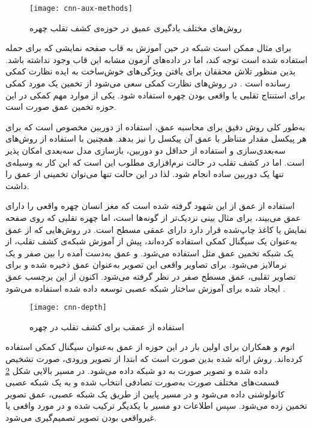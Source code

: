 \begin{figure}[h]
	\centerline{\texttt{[image: cnn-aux-methods]}}
	\caption{روش‌های مختلف یادگیری عمیق در حوزه‌ی کشف تقلب چهره \cite{yu2021deep}}
	\label{fig:cnn-aux-methods}
\end{figure}

برای مثال ممکن است شبکه در حین آموزش به قاب صفحه نمایشی که برای حمله استفاده شده است توجه کند، اما در داده‌های آزمون مشابه این قاب وجود نداشته باشد. بدین منظور تلاش محققان برای یافتن ویژگی‌های خوش‌ساخت
 به ایده نظارت کمکی
  رسانده است
\cite{liu2018learning}.  
در روش‌های نظارت کمکی سعی می‌شود از تخمین یک مورد کمکی برای استنتاج تقلبی یا واقعی بودن چهره استفاده شود. یکی از موارد مهم کمکی در این حوزه تخمین عمق صورت است.


به‌طور کلی روش دقیق برای محاسبه عمق، استفاده از دوربین مخصوص است که برای هر پیکسل مقدار متناظر با عمق آن پیکسل را نیز بدهد. همچنین با استفاده از روش‌های سه‌بعدی‌سازی و استفاده از حداقل دو دوربین، بازسازی مدل سه‌بعدی امکان پذیر است. اما در کشف تقلب در حالت نرم‌افزاری مطلوب این است که این کار به وسیله‌ی تنها یک دوربین ساده انجام شود. لذا در این حالت تنها می‌توان تخمینی از عمق را داشت.


استفاده از عمق از این شهود گرفته شده است که مغز انسان چهره واقعی را دارای عمق می‌بیند، برای مثال بینی نزدیک‌تر از گونه‌ها است، اما چهره تقلبی که روی صفحه نمایش یا کاغذ چاپ‌شده قرار دارد دارای عمقی مسطح است. در روش‌هایی که از عمق به‌عنوان یک سیگنال کمکی استفاده کرده‌اند، پیش از آموزش شبکه‌ی کشف تقلب، از یک شبکه تخمین عمق مثل 
 \cite{feng2018joint} 
استفاده می‌شود. و عمق به‌دست آمده را بین صفر و یک نرمالایز می‌شود. برای تصاویر واقعی این تصویر به‌عنوان عمق ذخیره شده و برای تصاویر تقلبی، عمق مسطح صفر در نظر گرفته می‌شود. اکنون از این برچسب عمق ایجاد شده برای آموزش ساختار شبکه عصبی توسعه داده شده استفاده می‌شود
\cite{atoum2017face,yu2020searching,shao2019multi,liu2018learning,wang2020deep,wang2018exploiting}.
\begin{figure}[h]
	\centerline{\texttt{[image: cnn-depth]}}
	\caption{استفاده از عمقب برای کشف تقلب در چهره  \cite{atoum2017face}}
	\label{fig:cnn-depth}
\end{figure}

اتوم و همکاران
\cite{atoum2017face}
  برای اولین بار در این حوزه از عمق به‌عنوان سیگنال کمکی استفاده کرده‌اند. روش ارائه شده بدین صورت است که ابتدا از تصویر ورودی، صورت تشخیص داده شده و تصویر صورت به دو شبکه داده می‌شود. در مسیر بالایی شکل
\ref{fig:cnn-depth}
   قسمت‌های مختلف صورت به‌صورت تصادفی انتخاب شده و به یک شبکه عصبی کانولوشنی داده می‌شود و در مسیر پایین از طریق یک شبکه عصبی، عمق تصویر تخمین زده می‌شود. سپس اطلاعات دو مسیر با یکدیگر ترکیب شده و در مورد واقعی یا غیرواقعی بودن تصویر تصمیم‌گیری می‌شود.
   
